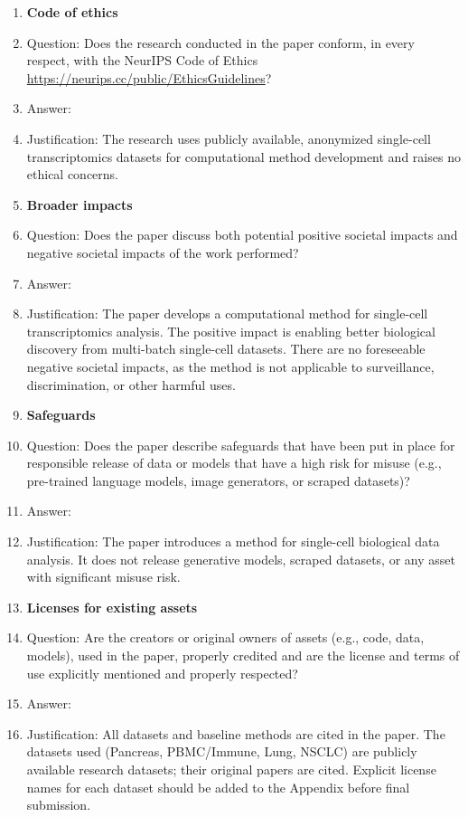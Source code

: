\begin{enumerate}
\item {\bf Code of ethics}
    \item[] Question: Does the research conducted in the paper conform, in every respect, with the NeurIPS Code of Ethics \url{https://neurips.cc/public/EthicsGuidelines}?
    \item[] Answer: \answerYes{}
    \item[] Justification: The research uses publicly available, anonymized single-cell transcriptomics datasets for computational method development and raises no ethical concerns.

\item {\bf Broader impacts}
    \item[] Question: Does the paper discuss both potential positive societal impacts and negative societal impacts of the work performed?
    \item[] Answer: \answerNA{}
    \item[] Justification: The paper develops a computational method for single-cell transcriptomics analysis. The positive impact is enabling better biological discovery from multi-batch single-cell datasets. There are no foreseeable negative societal impacts, as the method is not applicable to surveillance, discrimination, or other harmful uses.

\item {\bf Safeguards}
    \item[] Question: Does the paper describe safeguards that have been put in place for responsible release of data or models that have a high risk for misuse (e.g., pre-trained language models, image generators, or scraped datasets)?
    \item[] Answer: \answerNA{}
    \item[] Justification: The paper introduces a method for single-cell biological data analysis. It does not release generative models, scraped datasets, or any asset with significant misuse risk.

\item {\bf Licenses for existing assets}
    \item[] Question: Are the creators or original owners of assets (e.g., code, data, models), used in the paper, properly credited and are the license and terms of use explicitly mentioned and properly respected?
    \item[] Answer: \answerYes{}
    \item[] Justification: All datasets and baseline methods are cited in the paper. The datasets used (Pancreas, PBMC/Immune, Lung, NSCLC) are publicly available research datasets; their original papers are cited. Explicit license names for each dataset should be added to the Appendix before final submission.


\end{enumerate}
